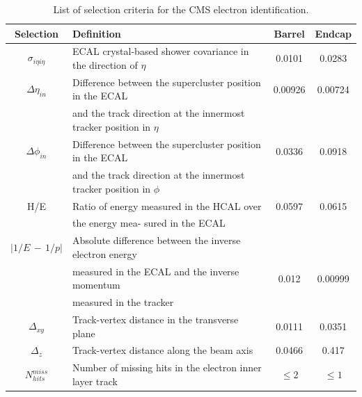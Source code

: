 \begin{table}[ht]
\begin{center}
\begin{tabular}{|c|l|c|c|}\hline
Selection        & Definition & Barrel & Endcap \\
\hline
\hline
$\sigma_{i\eta i\eta}$& ECAL crystal-based shower covariance in the direction of $\eta$& 0.0101&0.0283\\\hline
$\Delta\eta_{in}$ &Difference between the supercluster position in the ECAL & 0.00926& 0.00724 \\
& and the track direction at the innermost tracker position in $\eta$&&\\\hline
$\Delta\phi_{in}$ &Difference between the supercluster position in the ECAL &0.0336 &0.0918\\
 & and the track direction at the innermost tracker position in $\phi$  & &\\\hline
H/E & Ratio of energy measured in the HCAL over&0.0597&0.0615\\
& the energy mea- sured in the ECAL&&\\\hline
$|1/E \, -\,1/p |$& Absolute difference between the inverse electron energy&& \\
&measured in the ECAL and the inverse momentum &0.012&0.00999 \\
&measured in the tracker && \\\hline
$\Delta_{xy}$&Track-vertex distance in the transverse plane &0.0111&0.0351\\\hline
$\Delta_{z}$& Track-vertex distance along the beam axis&0.0466&0.417 \\\hline
$N^{miss}_{hits}$&Number of missing hits in the electron inner layer track& $\leq2$&$\leq1$\\\hline
\end{tabular}
\end{center}
\caption{List of selection criteria for the CMS electron identification.}\label{tab:EleSel}
\end{table}
\renewcommand{\arraystretch}{1}
